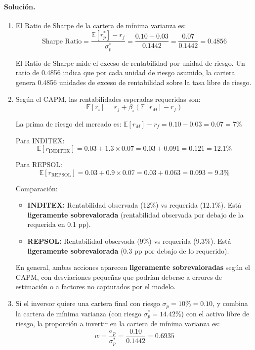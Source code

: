 \documentclass[12pt,a4paper]{article}
\newcommand{\E}{\mathbb{E}}
\newenvironment{solucion}{\paragraph{Solución.}}{}
\begin{document}
\begin{solucion}
\begin{enumerate}[label=\alph*)]
  Desviación estándar:
  \[
  \sigma_p^* = \sqrt{0.020799} = 0.1442 = 14.42\%
  \]
  
  \textbf{Observación:} La cartera de mínima varianza logra el menor riesgo (14.42\%) y es inferior al de la cartera equiponderada (14.87\%).

  \item El Ratio de Sharpe de la cartera de mínima varianza es:
  \[
  \text{Sharpe Ratio} = \frac{\E[r_p^*] - r_f}{\sigma_p^*} = \frac{0.10 - 0.03}{0.1442} = \frac{0.07}{0.1442} = 0.4856
  \]
  
  El Ratio de Sharpe mide el exceso de rentabilidad por unidad de riesgo. Un ratio de 0.4856 indica que por cada unidad de riesgo asumido, la cartera genera 0.4856 unidades de exceso de rentabilidad sobre la tasa libre de riesgo.

  \item Según el CAPM, las rentabilidades esperadas requeridas son:
  \[
  \E[r_i] = r_f + \beta_i (\E[r_M] - r_f)
  \]
  
  La prima de riesgo del mercado es: $\E[r_M] - r_f = 0.10 - 0.03 = 0.07 = 7\%$
  
  Para INDITEX:
  \[
  \E[r_{\text{INDITEX}}] = 0.03 + 1.3 \times 0.07 = 0.03 + 0.091 = 0.121 = 12.1\%
  \]
  
  Para REPSOL:
  \[
  \E[r_{\text{REPSOL}}] = 0.03 + 0.9 \times 0.07 = 0.03 + 0.063 = 0.093 = 9.3\%
  \]
  
  Comparación:
  \begin{itemize}
    \item \textbf{INDITEX:} Rentabilidad observada (12\%) vs requerida (12.1\%). Está \textbf{ligeramente sobrevalorada} (rentabilidad observada por debajo de la requerida en 0.1 pp).
    \item \textbf{REPSOL:} Rentabilidad observada (9\%) vs requerida (9.3\%). Está \textbf{ligeramente sobrevalorada} (0.3 pp por debajo de lo requerido).
  \end{itemize}
  
  En general, ambas acciones aparecen \textbf{ligeramente sobrevaloradas} según el CAPM, con desviaciones pequeñas que podrían deberse a errores de estimación o a factores no capturados por el modelo.

  \item Si el inversor quiere una cartera final con riesgo $\sigma_p = 10\% = 0.10$, y combina la cartera de mínima varianza (con riesgo $\sigma_p^* = 14.42\%$) con el activo libre de riesgo, la proporción a invertir en la cartera de mínima varianza es:
  \[
  w = \frac{\sigma_p}{\sigma_p^*} = \frac{0.10}{0.1442} = 0.6935
  \]
  

\end{enumerate}
\end{solucion}
\end{document}
